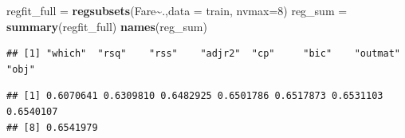 \documentclass[
]{article}
\newenvironment{Shaded}{\begin{snugshade}}{\end{snugshade}}
\newcommand{\AttributeTok}[1]{\textcolor[rgb]{0.13,0.29,0.53}{#1}}
\newcommand{\DecValTok}[1]{\textcolor[rgb]{0.00,0.00,0.81}{#1}}
\newcommand{\FunctionTok}[1]{\textcolor[rgb]{0.13,0.29,0.53}{\textbf{#1}}}
\newcommand{\NormalTok}[1]{#1}
\newcommand{\OtherTok}[1]{\textcolor[rgb]{0.56,0.35,0.01}{#1}}
\newcommand{\SpecialCharTok}[1]{\textcolor[rgb]{0.81,0.36,0.00}{\textbf{#1}}}
\newcommand{\StringTok}[1]{\textcolor[rgb]{0.31,0.60,0.02}{#1}}
\begin{document}
\begin{Shaded}
\begin{Highlighting}[]
\NormalTok{regfit\_full }\OtherTok{=} \FunctionTok{regsubsets}\NormalTok{(Fare}\SpecialCharTok{\textasciitilde{}}\NormalTok{.,}\AttributeTok{data =}\NormalTok{ train, }\AttributeTok{nvmax=}\DecValTok{8}\NormalTok{)}
\NormalTok{reg\_sum }\OtherTok{=} \FunctionTok{summary}\NormalTok{(regfit\_full)}
\FunctionTok{names}\NormalTok{(reg\_sum)}
\end{Highlighting}
\end{Shaded}

\begin{verbatim}
## [1] "which"  "rsq"    "rss"    "adjr2"  "cp"     "bic"    "outmat" "obj"
\end{verbatim}

\begin{Shaded}
\end{Shaded}

\begin{verbatim}
## [1] 0.6070641 0.6309810 0.6482925 0.6501786 0.6517873 0.6531103 0.6540107
## [8] 0.6541979
\end{verbatim}

\begin{Shaded}
\end{Shaded}
\end{document}

